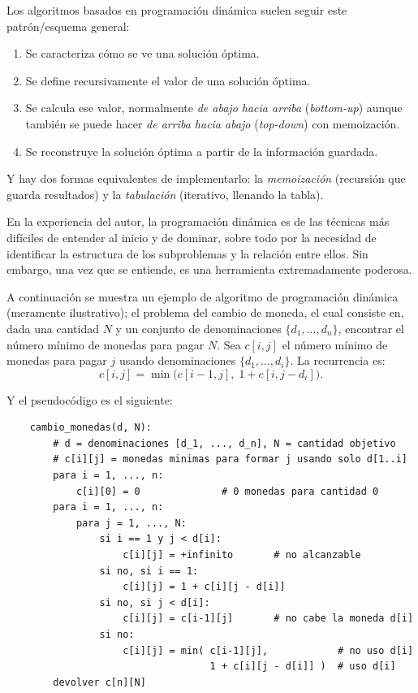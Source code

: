 \documentclass[12pt,letterpaper]{article}
\begin{document}
Los algoritmos basados en programación dinámica suelen seguir este 
patrón/esquema general:
\begin{enumerate}
    \item Se caracteriza cómo se ve una solución óptima.
    \item Se define recursivamente el valor de una solución óptima.
    \item Se calcula ese valor, normalmente \emph{de abajo hacia arriba} 
    (\emph{bottom-up}) aunque también se puede hacer \emph{de arriba hacia 
    abajo} (\emph{top-down}) con memoización.
    \item Se reconstruye la solución óptima a partir de la información guardada.
\end{enumerate}
Y hay dos formas equivalentes de implementarlo: la \emph{memoización} 
(recursión que guarda resultados) y la \emph{tabulación} (iterativo, llenando 
la tabla).

En la experiencia del autor, la programación dinámica es de las técnicas más 
difíciles de entender al inicio y de dominar, sobre todo por la necesidad de 
identificar la estructura de los subproblemas y la relación entre ellos. Sin 
embargo, una vez que se entiende, es una herramienta extremadamente poderosa.

A continuación se muestra un ejemplo de algoritmo de programación dinámica 
(meramente ilustrativo); el problema del cambio de moneda, el cual consiste en, 
dada una cantidad $N$ y un conjunto de denominaciones $\{d_1,\dots,d_n\}$, 
encontrar el número mínimo de monedas para pagar $N$. Sea $c[i,j]$ el número 
mínimo de monedas para pagar $j$ usando denominaciones $\{d_1,\dots,d_i\}$. 
La recurrencia es:
\begin{equation*}
    c[i,j] = \min\bigl(c[i-1,j],\; 1 + c[i, j - d_i]\bigr).
\end{equation*}

Y el pseudocódigo es el siguiente:

\begin{verbatim}
    cambio_monedas(d, N):
        # d = denominaciones [d_1, ..., d_n], N = cantidad objetivo
        # c[i][j] = monedas minimas para formar j usando solo d[1..i]
        para i = 1, ..., n:
            c[i][0] = 0              # 0 monedas para cantidad 0
        para i = 1, ..., n:
            para j = 1, ..., N:
                si i == 1 y j < d[i]:
                    c[i][j] = +infinito       # no alcanzable
                si no, si i == 1:
                    c[i][j] = 1 + c[i][j - d[i]]
                si no, si j < d[i]:
                    c[i][j] = c[i-1][j]       # no cabe la moneda d[i]
                si no:
                    c[i][j] = min( c[i-1][j],            # no uso d[i]
                                   1 + c[i][j - d[i]] )  # uso d[i]
        devolver c[n][N]
\end{verbatim}
\end{document}
